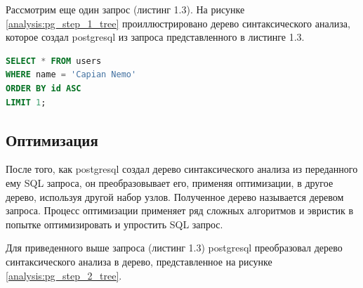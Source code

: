 Рассмотрим еще один запрос (листинг 1.3). 
На рисунке \ref{analysis:pg_step_1_tree} проиллюстрировано дерево синтаксического анализа, 
которое создал postgresql из запроса представленного в листинге 1.3.

\begin{lstlisting}[language=SQL, label=some-code, caption=Пример SQL запроса над таблицей users]
SELECT * FROM users
WHERE name = 'Capian Nemo'
ORDER BY id ASC
LIMIT 1;
\end{lstlisting}

\begin{figure}[ht!]
\end{figure}

\subsection{Оптимизация}

После того, как postgresql создал дерево синтаксического анализа из переданного ему SQL запроса,
он преобразовывает его, применяя оптимизации, в другое дерево, используя другой набор узлов.
Полученное дерево называется деревом запроса.
Процесс оптимизации применяет ряд сложных алгоритмов и эвристик в 
попытке оптимизировать и упростить SQL запрос.

Для приведенного выше запроса (листинг 1.3) postgresql преобразовал дерево 
синтаксического анализа в дерево,
представленное на рисунке \ref{analysis:pg_step_2_tree}.

\begin{figure}[ht!]
\end{figure}

